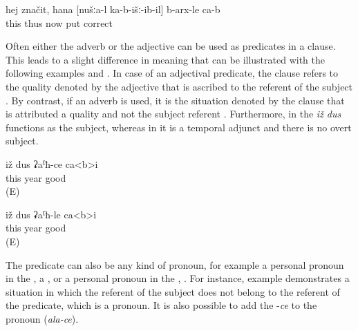 \begin{exe}
	\ex	\label{ex:‎This means, how we put (the pictures) down is correct}
	\gll	hej	značit,	hana	[nušːa-l	ka-b-išː-ib-il]	b-arx-le	ca-b\\
		this	thus	now		put	correct	\\
	\glt	{}
\end{exe}

Often either the adverb or the adjective can be used as predicates in a  clause. This leads to a slight difference in meaning that can be illustrated with the following examples  and . In case of an adjectival predicate, the  clause refers to the quality denoted by the adjective that is ascribed to the referent of the subject . By contrast, if an adverb is used, it is the situation denoted by the  clause that is attributed a quality and not the subject referent . Furthermore, in  the  \textit{iž dus} functions as the subject, whereas in  it is a temporal adjunct and there is no overt subject.

\begin{exe}

	\ex	\label{ex:This year is good}
	\gll	iž	dus	ʡaˁħ-ce	ca<b>i\\
		this	year	good	\\
	\glt	{} (E)
	
	
	\ex	\label{ex:In / during this year it is good}
	\gll	iž	dus	ʡaˁħ-le	ca<b>i\\
		this	year	good	\\
	\glt	{} (E)

\end{exe}

The predicate can also be any kind of pronoun, for example a personal pronoun in the  , a , or a personal pronoun in the  , . For instance, example  demonstrates a situation in which the referent of the  subject does not belong to the referent of the predicate, which is a  pronoun. It is also possible to add the  -\textit{ce} to the  pronoun (\textit{ala-ce}).

